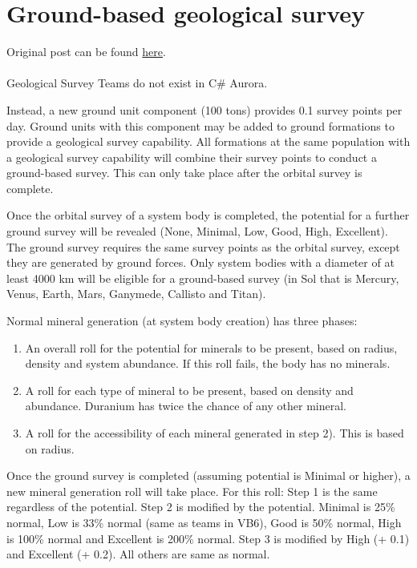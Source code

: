 \documentclass[../../Aurora C# unofficial manual.tex]{subfiles}
\begin{document}
	\section{Ground-based geological survey}
	Original post can be found
	\href{http://aurora2.pentarch.org/index.php?topic=8495.msg107705#msg107705}{here}.
	\\\\
	
	Geological Survey Teams do not exist in C\# Aurora.
	
	Instead, a new ground unit component (100 tons) provides 0.1 survey points per day. Ground units with this component may be added to ground formations to provide a geological survey capability. All formations at the same population with a geological survey capability will combine their survey points to conduct a ground-based survey. This can only take place after the orbital survey is complete.
	
	Once the orbital survey of a system body is completed, the potential for a further ground survey will be revealed (None, Minimal, Low, Good, High, Excellent). The ground survey requires the same survey points as the orbital survey, except they are generated by ground forces. Only system bodies with a diameter of at least 4000 km will be eligible for a ground-based survey (in Sol that is Mercury, Venus, Earth, Mars, Ganymede, Callisto and Titan).

	Normal mineral generation (at system body creation) has three phases:
	\begin{enumerate}
		\item An overall roll for the potential for minerals to be present, based on radius, density and system abundance. If this roll fails, the body has no minerals.
		\item A roll for each type of mineral to be present, based on density and abundance. Duranium has twice the chance of any other mineral.
		\item A roll for the accessibility of each mineral generated in step 2). This is based on radius.
	\end{enumerate}

	Once the ground survey is completed (assuming potential is Minimal or higher), a new mineral generation roll will take place. For this roll:
	Step 1 is the same regardless of the potential.
	Step 2 is modified by the potential. Minimal is 25\% normal, Low is 33\% normal (same as teams in VB6), Good is 50\% normal, High is 100\% normal and Excellent is 200\% normal.
	Step 3 is modified by High (+ 0.1) and Excellent (+ 0.2). All others are same as normal.
	
\end{document}
